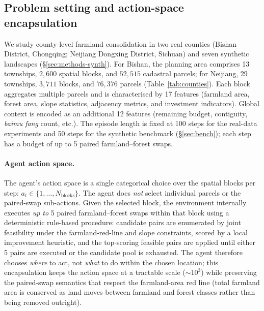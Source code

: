 \documentclass[11pt]{article}
\begin{document}
\subsection*{Problem setting and action-space encapsulation}\label{sec:methods-action}

We study county-level farmland consolidation in two real counties (Bishan District, Chongqing; Neijiang Dongxing District, Sichuan) and seven synthetic landscapes (\S\ref{sec:methods-synth}). For Bishan, the planning area comprises 13 townships, $2{,}600$ spatial blocks, and $52{,}515$ cadastral parcels; for Neijiang, 29 townships, $3{,}711$ blocks, and $76{,}376$ parcels (Table~\ref{tab:counties}). Each block aggregates multiple parcels and is characterised by 17 features (farmland area, forest area, slope statistics, adjacency metrics, and investment indicators). Global context is encoded as an additional 12 features (remaining budget, contiguity, \textit{baimu fang} count, etc.). The episode length is fixed at 100 steps for the real-data experiments and 50 steps for the synthetic benchmark (\S\ref{sec:bench}); each step has a budget of up to 5 paired farmland--forest swaps.

\paragraph{Agent action space.}
The agent's action space is a single categorical choice over the spatial blocks per step: $a_t \in \{1, \ldots, N_{\text{blocks}}\}$. The agent does \emph{not} select individual parcels or the paired-swap sub-actions. Given the selected block, the environment internally executes \emph{up to} 5 paired farmland--forest swaps within that block using a deterministic rule-based procedure: candidate pairs are enumerated by joint feasibility under the farmland-red-line and slope constraints, scored by a local improvement heuristic, and the top-scoring feasible pairs are applied until either 5 pairs are executed or the candidate pool is exhausted. The agent therefore chooses \emph{where} to act, not \emph{what} to do within the chosen location; this encapsulation keeps the action space at a tractable scale ($\sim 10^3$) while preserving the paired-swap semantics that respect the farmland-area red line (total farmland area is conserved as land moves between farmland and forest classes rather than being removed outright).
\end{document}
